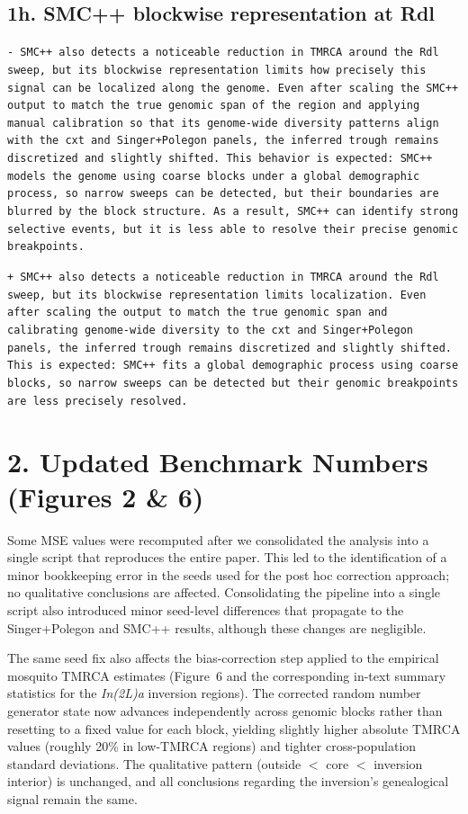 \documentclass[10pt]{article}
\newcommand{\rem}[1]{\par\noindent\colorbox{rembg}{\parbox{\dimexpr\linewidth-2\fboxsep}{\small\textcolor{remtext}{\texttt{-\ #1}}}}}
\newcommand{\add}[1]{\par\noindent\colorbox{addbg}{\parbox{\dimexpr\linewidth-2\fboxsep}{\small\textcolor{addtext}{\texttt{+\ #1}}}}}
\begin{document}
\subsection*{\small 1h. SMC++ blockwise representation at Rdl}
\begin{mdframed}[style=diffbox]
\rem{SMC++ also detects a noticeable reduction in TMRCA around the Rdl sweep, but its blockwise representation limits how precisely this signal can be localized along the genome. Even after scaling the SMC++ output to match the true genomic span of the region and applying manual calibration so that its genome-wide diversity patterns align with the cxt and Singer+Polegon panels, the inferred trough remains discretized and slightly shifted. This behavior is expected: SMC++ models the genome using coarse blocks under a global demographic process, so narrow sweeps can be detected, but their boundaries are blurred by the block structure. As a result, SMC++ can identify strong selective events, but it is less able to resolve their precise genomic breakpoints.}
\add{SMC++ also detects a noticeable reduction in TMRCA around the Rdl sweep, but its blockwise representation limits localization. Even after scaling the output to match the true genomic span and calibrating genome-wide diversity to the cxt and Singer+Polegon panels, the inferred trough remains discretized and slightly shifted. This is expected: SMC++ fits a global demographic process using coarse blocks, so narrow sweeps can be detected but their genomic breakpoints are less precisely resolved.}
\end{mdframed}

\section*{\textcolor{accent}{2. Updated Benchmark Numbers (Figures 2 \& 6)}}

Some MSE values were recomputed after we consolidated the analysis into a single script that reproduces the entire paper. This led to the identification of a minor bookkeeping error in the seeds used for the post hoc correction approach; no qualitative conclusions are affected. Consolidating the pipeline into a single script also introduced minor seed-level differences that propagate to the Singer+Polegon and SMC++ results, although these changes are negligible.

The same seed fix also affects the bias-correction step applied to the empirical mosquito TMRCA estimates (Figure~6 and the corresponding in-text summary statistics for the \emph{In(2L)a} inversion regions). The corrected random number generator state now advances independently across genomic blocks rather than resetting to a fixed value for each block, yielding slightly higher absolute TMRCA values (roughly 20\% in low-TMRCA regions) and tighter cross-population standard deviations. The qualitative pattern (outside $<$ core $<$ inversion interior) is unchanged, and all conclusions regarding the inversion's genealogical signal remain the same.
\end{document}
